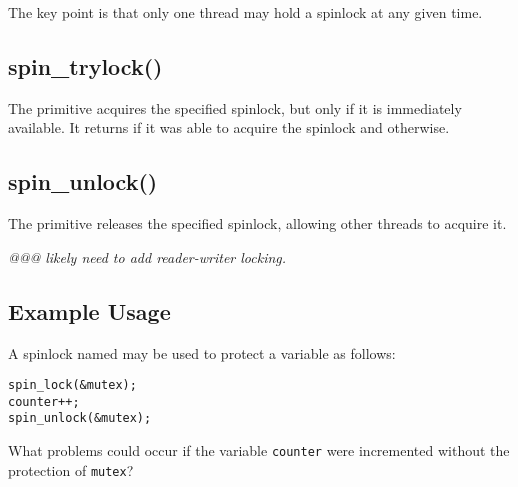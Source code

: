 The key point is that only one thread may hold a spinlock at any
given time.

\subsection{spin\_trylock()}

The  primitive acquires the specified spinlock,
but only if it is immediately available.
It returns  if it was able to acquire the spinlock and
 otherwise.

\subsection{spin\_unlock()}

The  primitive releases the specified spinlock,
allowing other threads to acquire it.

\emph{@@@ likely need to add reader-writer locking.}

\subsection{Example Usage}

A spinlock named  may be used to protect a variable
 as follows:

\vspace{5pt}
\begin{minipage}[t]{\columnwidth}
\small
\begin{verbatim}
spin_lock(&mutex);
counter++;
spin_unlock(&mutex);
\end{verbatim}
\end{minipage}
\vspace{5pt}

\QuickQuiz{}
	What problems could occur if the variable {\tt counter} were
	incremented without the protection of {\tt mutex}?
 \QuickQuizEnd

